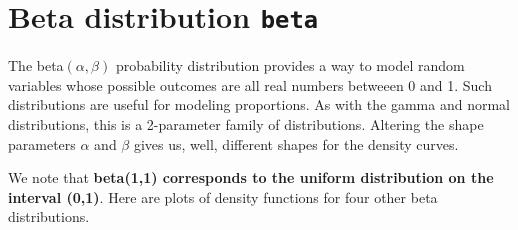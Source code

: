 \documentclass[
]{book}
\theoremstyle{definition}
\theoremstyle{definition}
\theoremstyle{definition}
\theoremstyle{definition}
\theoremstyle{remark}
\begin{document}
\section{\texorpdfstring{Beta distribution \texttt{beta}}{Beta distribution beta}}\label{betaR}

The beta\((\alpha,\beta)\) probability distribution provides a way to model random variables whose possible outcomes are all real numbers betweeen 0 and 1. Such distributions are useful for modeling proportions. As with the gamma and normal distributions, this is a 2-parameter family of distributions. Altering the shape parameters \(\alpha\) and \(\beta\) gives us, well, different shapes for the density curves.

We note that \textbf{beta(1,1) corresponds to the uniform distribution on the interval (0,1)}. Here are plots of density functions for four other beta distributions.
\end{document}

